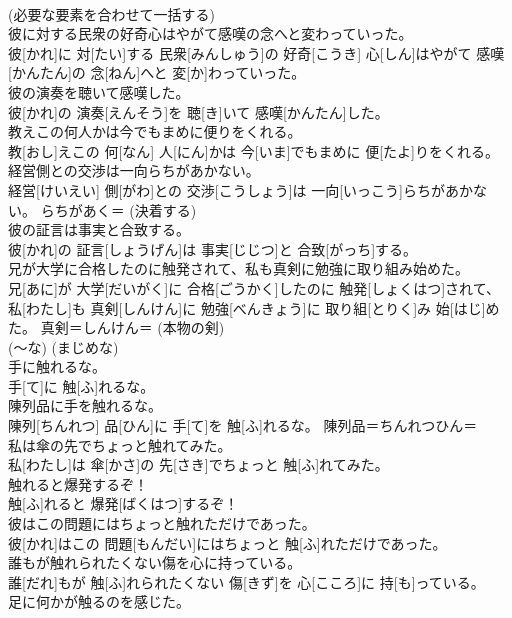 \documentclass[8pt]{extreport}
\begin{document}
\begin{CJK}{UTF8}{min}
\\	(必要な要素を合わせて一括する) 
\\	彼に対する民衆の好奇心はやがて感嘆の念へと変わっていった。	
\\	彼[かれ]に 対[たい]する 民衆[みんしゅう]の 好奇[こうき] 心[しん]はやがて 感嘆[かんたん]の 念[ねん]へと 変[か]わっていった。	
\\	彼の演奏を聴いて感嘆した。	
\\	彼[かれ]の 演奏[えんそう]を 聴[き]いて 感嘆[かんたん]した。	
\\	教えこの何人かは今でもまめに便りをくれる。	
\\	教[おし]えこの 何[なん] 人[にん]かは 今[いま]でもまめに 便[たよ]りをくれる。	
\\	経営側との交渉は一向らちがあかない。	
\\	経営[けいえい] 側[がわ]との 交渉[こうしょう]は 一向[いっこう]らちがあかない。	らちがあく＝ (決着する) 
\\	彼の証言は事実と合致する。	
\\	彼[かれ]の 証言[しょうげん]は 事実[じじつ]と 合致[がっち]する。	
\\	兄が大学に合格したのに触発されて、私も真剣に勉強に取り組み始めた。	
\\	兄[あに]が 大学[だいがく]に 合格[ごうかく]したのに 触発[しょくはつ]されて、 私[わたし]も 真剣[しんけん]に 勉強[べんきょう]に 取り組[とりく]み 始[はじ]めた。	真剣＝しんけん＝ (本物の剣) 
\\	(〜な) (まじめな) 
\\	手に触れるな。	
\\	手[て]に 触[ふ]れるな。	
\\	陳列品に手を触れるな。	
\\	陳列[ちんれつ] 品[ひん]に 手[て]を 触[ふ]れるな。	陳列品＝ちんれつひん＝ 
\\	私は傘の先でちょっと触れてみた。	
\\	私[わたし]は 傘[かさ]の 先[さき]でちょっと 触[ふ]れてみた。	
\\	触れると爆発するぞ！	
\\	触[ふ]れると 爆発[ばくはつ]するぞ！	
\\	彼はこの問題にはちょっと触れただけであった。	
\\	彼[かれ]はこの 問題[もんだい]にはちょっと 触[ふ]れただけであった。	
\\	誰もが触れられたくない傷を心に持っている。	
\\	誰[だれ]もが 触[ふ]れられたくない 傷[きず]を 心[こころ]に 持[も]っている。	
\\	足に何かが触るのを感じた。	

\end{CJK}
\end{document}
